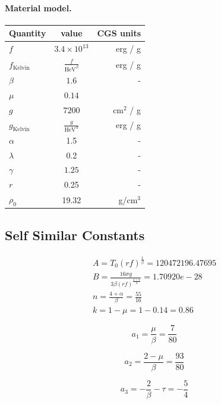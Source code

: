 \documentclass[11pt]{article}
\newcommand{\HeV}{\text{HeV}}
\begin{document}
\paragraph{Material model.}
\begin{center}
\begin{tabular}{l c r}
\hline
Quantity & value & CGS units\\
\hline
$f$ & $3.4\times10^{13}$ & erg / g\\
$f_{\text{Kelvin}}$ & $\frac{f}{\HeV^{\beta}}$ & erg / g\\
$\beta$ & $1.6$ & - \\
$\mu$ & $0.14$ &  \\

$g$ & $7200$ & cm$^2$ / g\\
$g_{\text{Kelvin}}$ & $\frac{g}{\HeV^{\alpha}}$ & erg / g\\
$\alpha$ &  1.5 & - \\
$\lambda$ & 0.2 & - \\

$\gamma$ & $1.25$ & - \\ 
$r$ & 0.25 & - \\
$\rho_0$ & 19.32 & g/cm$^3$\\
\hline
\end{tabular}
\end{center}

\subsection{Self Similar Constants}
\begin{gather}
    A = T_0 (rf)^\frac{1}{\beta} = 120472196.47695 \\
    B = \frac{16 \sigma g}{3\beta(rf)^{\frac{4+\alpha}{\beta}}} = 1.70920e-28 \\
    n = \frac{4+\alpha}{\beta} = \frac{55}{16} \\
    k = 1 - \mu = 1 - 0.14 = 0.86
\end{gather}

\begin{equation}
a_1 = \frac{\mu}{\beta} = \frac{7}{80}
\end{equation}

\begin{equation}
a_2 = \frac{2 - \mu}{\beta} = \frac{93}{80}
\end{equation}

\begin{equation}
a_3 = -\frac{2}{\beta} - \tau = -\frac{5}{4}
\end{equation}
\end{document}
